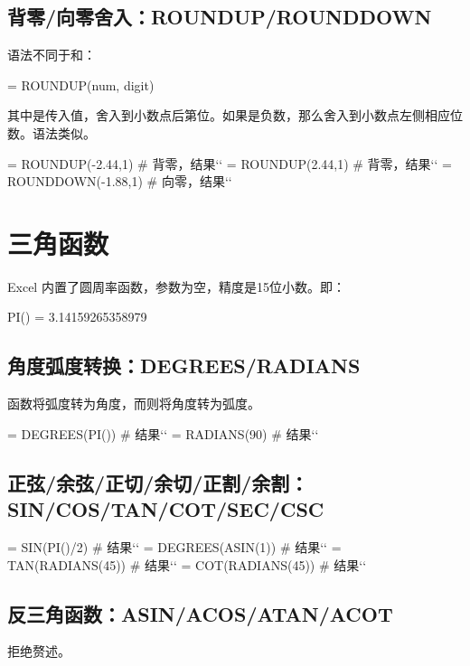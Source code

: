 \subsection{背零/向零舍入：ROUNDUP/ROUNDDOWN}
语法不同于和：
\begin{syntax}
= ROUNDUP(num, digit)
\end{syntax}

其中是传入值，舍入到小数点后第位。如果是负数，那么舍入到小数点左侧相应位数。语法类似。

\begin{excode}
= ROUNDUP(-2.44,1)  # 背零，结果``
= ROUNDUP(2.44,1)  # 背零，结果``
= ROUNDDOWN(-1.88,1)  # 向零，结果``
\end{excode}

\section{三角函数}
Excel 内置了圆周率函数，参数为空，精度是15位小数。即：
\begin{syntax}
PI() = 3.14159265358979
\end{syntax}

\subsection{角度弧度转换：DEGREES/RADIANS}
函数将弧度转为角度，而则将角度转为弧度。
\begin{excode}
= DEGREES(PI())  # 结果``
= RADIANS(90)  # 结果``
\end{excode}

\subsection{正弦/余弦/正切/余切/正割/余割：SIN/COS/TAN/COT/SEC/CSC}
\begin{excode}
= SIN(PI()/2)  # 结果``
= DEGREES(ASIN(1))  # 结果``
= TAN(RADIANS(45))  # 结果``
= COT(RADIANS(45))  # 结果``
\end{excode}

\subsection{反三角函数：ASIN/ACOS/ATAN/ACOT}
拒绝赘述。

